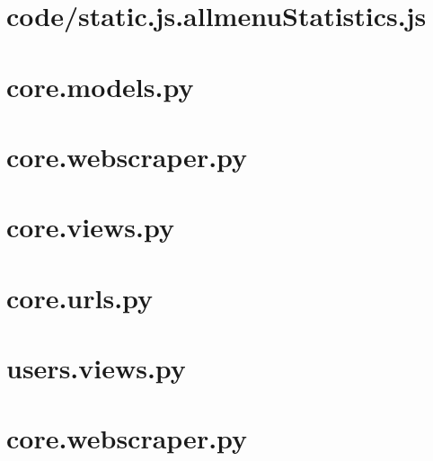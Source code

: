 \section{code/static.js.allmenuStatistics.js}

\section{core.models.py}\label{code:core.models.py}

\section{core.webscraper.py}\label{code:core.webscraper.py}

\section{core.views.py}\label{code:core.views.py}

\section{core.urls.py}\label{code:core.urls.py}

\section{users.views.py}\label{code:users.views.py}

\section{core.webscraper.py}\label{code:core.webscraper.py}




